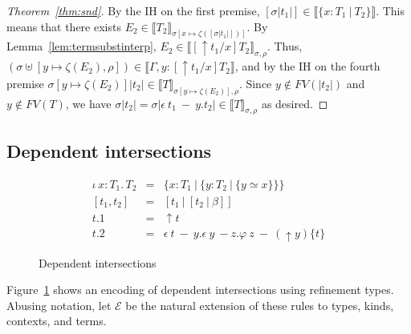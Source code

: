 \documentclass{article}
\newcommand{\choice}[0]{\zeta}
\newcommand{\abs}[4]{{#1}\, #2\! : \! #3.\, #4}
\newcommand{\interp}[1]{\llbracket #1 \rrbracket}
\begin{document}
\begin{proof}[Theorem~\ref{thm:snd}]
By the IH on the first premise, \([\sigma|t_1|] \in \interp{\{x : T_1\ |\
  T_2\}}\).
This means that there exists \(E_2 \in \interp{T_2}_{\sigma[x \mapsto
  \choice([\sigma|t_1|])]}\).
By Lemma~\ref{lem:termsubstinterp}, \(E_2 \in \interp{[\uparrow
  t_1/x]T_2}_{\sigma,\rho}\).
Thus, \((\sigma \uplus [y \mapsto \choice(E_2),\rho]) \in \interp{\Gamma,y :
  [\uparrow t_1/x]T_2}\), and by the IH on the fourth premise \(\sigma[y \mapsto
\choice(E_2)]|t_2| \in \interp{T}_{\sigma[y \mapsto \choice(E_2)],\rho}\).
Since \(y \notin \mathit{FV}(|t_2|)\) and \(y \notin \mathit{FV}(T)\), we have
\(\sigma|t_2| = \sigma|\epsilon\ t_1\ -\ y.t_2| \in \interp{T}_{\sigma,\rho}\)
as desired.

\end{proof}


\subsection{Dependent intersections}

\begin{figure}[h]
  \centering
  \[
    \begin{array}{lll}
      \abs{\iota}{x}{T_1}{T_2}
      & =
      & \{ x : T_1\ |\ \{y : T_2\ |\ \{y \simeq x \}\} \}
      \\ {[ t_1 , t_2 ]}
      & =
      & {[ t_1\ |\ [t_2\ |\ \beta]]}
      \\ t.1
      & =
      & \uparrow t
      \\ t.2
      & =
      & \epsilon\ t\ -\ y. \epsilon\ y\ - z. \varphi\ z\ -\ (\uparrow y) \{t\}
    \end{array}
  \]
  \caption{Dependent intersections}
  \label{fig:refinement-iota}
\end{figure}

Figure~\ref{fig:refinement-iota} shows an encoding of dependent intersections
using refinement types.
Abusing notation, let \(\mathcal{E}\) be the natural extension of these rules to
types, kinds, contexts, and terms.
\end{document}
